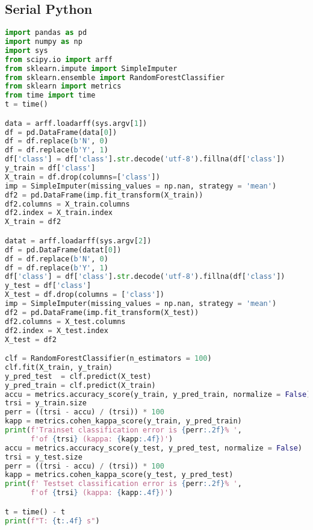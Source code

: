 \subsection{Serial Python}
\begin{lstlisting}[language=Python, caption={Serial Python implementation of the RF test case.}]
import pandas as pd
import numpy as np
import sys
from scipy.io import arff
from sklearn.impute import SimpleImputer
from sklearn.ensemble import RandomForestClassifier
from sklearn import metrics
from time import time
t = time()

data = arff.loadarff(sys.argv[1])
df = pd.DataFrame(data[0])
df = df.replace(b'N', 0)
df = df.replace(b'Y', 1)
df['class'] = df['class'].str.decode('utf-8').fillna(df['class'])
y_train = df['class']
X_train = df.drop(columns=['class'])
imp = SimpleImputer(missing_values = np.nan, strategy = 'mean')
df2 = pd.DataFrame(imp.fit_transform(X_train))
df2.columns = X_train.columns
df2.index = X_train.index
X_train = df2

datat = arff.loadarff(sys.argv[2])
df = pd.DataFrame(datat[0])
df = df.replace(b'N', 0)
df = df.replace(b'Y', 1)
df['class'] = df['class'].str.decode('utf-8').fillna(df['class'])
y_test = df['class']
X_test = df.drop(columns = ['class'])
imp = SimpleImputer(missing_values = np.nan, strategy = 'mean')
df2 = pd.DataFrame(imp.fit_transform(X_test))
df2.columns = X_test.columns
df2.index = X_test.index
X_test = df2

clf = RandomForestClassifier(n_estimators = 100)
clf.fit(X_train, y_train)
y_pred_test  = clf.predict(X_test)
y_pred_train = clf.predict(X_train)
accu = metrics.accuracy_score(y_train, y_pred_train, normalize = False)
trsi = y_train.size
perr = ((trsi - accu) / (trsi)) * 100
kapp = metrics.cohen_kappa_score(y_train, y_pred_train)
print(f'Trainset classification error is {perr:.2f}% ',
      f'of {trsi} (kappa: {kapp:.4f})')
accu = metrics.accuracy_score(y_test, y_pred_test, normalize = False)
trsi = y_test.size
perr = ((trsi - accu) / (trsi)) * 100
kapp = metrics.cohen_kappa_score(y_test, y_pred_test)
print(f' Testset classification error is {perr:.2f}% ',
      f'of {trsi} (kappa: {kapp:.4f})')

t = time() - t
print(f"T: {t:.4f} s")
\end{lstlisting}




